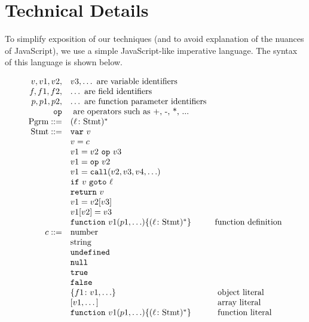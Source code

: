 \documentclass{sig-alternate}
\newcommand \dsl [1] {\ensuremath{{\tt #1}}\xspace}
\begin{document}
\section{Technical Details}
\label{sec:technical-details}

To simplify exposition of our techniques (and to avoid explanation of
the nuances of JavaScript), we use a simple JavaScript-like imperative
language.  The syntax of this language is shown below.

{\scriptsize
\[
\begin{array}{rll}
v, v1, v2, & v3, \ldots \mbox{ are variable identifiers}\\
f, f1, f2, & \ldots \mbox{ are field identifiers}\\
p, p1, p2, & \ldots \mbox{ are function parameter identifiers}\\
\dsl{op} & \mbox{ are operators such as +, -, *, ...} \\
\mbox{Pgrm} ::= & (\ell\colon \mbox{Stmt})^*\\
\mbox{Stmt} ::= &  \dsl{var}\ v\\
  & v = c\\
  &   v1 = v2\ \dsl{op}\ v3\\
  &   v1 = \dsl{op}\ v2\\
  &   v1 = \dsl{call}(v2, v3, v4, \ldots)\\
  &   \dsl{if}\ v \ \dsl{goto}\ \ell\\
  &   \dsl{return}\ v\\
  &   v1 = v2[v3]\\
  &   v1[v2] = v3\\
  &   \dsl{function}\ v1(p1, \ldots) \{ (\ell\colon \mbox{Stmt})^* \} & \mbox{function definition}\\
c ::= & \mbox{number}\\
  & \mbox{string} \\
  & \dsl{undefined} \\
  & \dsl{null} \\
  & \dsl{true}\\
  & \dsl{false}\\
  & \{f1\colon v1, \ldots\} &\mbox{ object literal}\\
  & [v1, \dots] &\mbox{ array literal}\\
  & \dsl{function}\ v1(p1, \ldots) \{ (\ell\colon \mbox{Stmt})^* \} & \mbox{
    function literal}\\
\end{array}
\]
}
\end{document}
